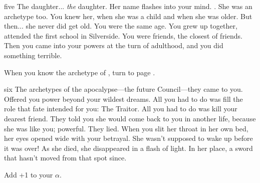 \documentclass[greennotebook]{Silversiders} %
\begin{document}
\begin{page}{five}
The daughter... \emph{the} daughter. Her name flashes into your mind. \cLoyalty{\intro}. She was an archetype too. You knew her, when she was a child and when she was older. But then... she never did get old. You were the same age. You grew up together, attended the first school in Silverside. You were friends, the closest of friends. Then you came into your powers at the turn of adulthood, and you did something terrible.

When you know the archetype of \cLoyalty{}, turn to page .
\end{page}

\begin{page}{six}
The archetypes of the apocalypse—the future Council—they came to you. Offered you power beyond your wildest dreams. All you had to do was fill the role that fate intended for you: The Traitor. All you had to do was kill your dearest friend. They told you she would come back to you in another life, because she was like you; powerful. They lied. When you slit her throat in her own bed, her eyes opened wide with your betrayal. She wasn't supposed to wake up before it was over! As she died, she disappeared in a flash of light. In her place, a sword that hasn't moved from that spot since. 

Add +1 to your $\alpha$.
\end{page}

\endnotebook
\end{document}
